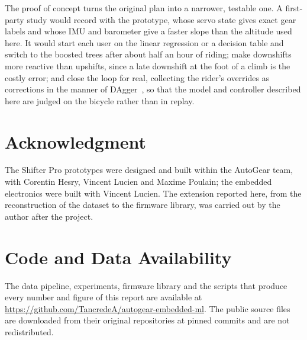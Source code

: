 \documentclass[conference]{IEEEtran}
\newcommand{\repourl}{https://github.com/TancredeA/autogear-embedded-ml}
\begin{document}
The proof of concept turns the original plan into a narrower, testable one. A first-party study would record with the prototype, whose servo state gives exact gear labels and whose IMU and barometer give a faster slope than the altitude used here. It would start each user on the linear regression or a decision table and switch to the boosted trees after about half an hour of riding; make downshifts more reactive than upshifts, since a late downshift at the foot of a climb is the costly error; and close the loop for real, collecting the rider's overrides as corrections in the manner of DAgger~\cite{dagger}, so that the model and controller described here are judged on the bicycle rather than in replay.

\section*{Acknowledgment}
The Shifter Pro prototypes were designed and built within the AutoGear team, with Corentin Hesry, Vincent Lucien and Maxime Poulain; the embedded electronics were built with Vincent Lucien. The extension reported here, from the reconstruction of the dataset to the firmware library, was carried out by the author after the project.

\section*{Code and Data Availability}
The data pipeline, experiments, firmware library and the scripts that produce every number and figure of this report are available at \url{\repourl}. The public source files are downloaded from their original repositories at pinned commits and are not redistributed.



\end{document}
